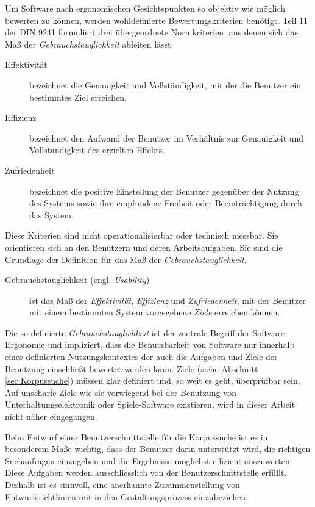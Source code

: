 Um Software nach ergonomischen Gesichtspunkten so objektiv wie möglich bewerten zu können, werden wohldefinierte Bewertungskriterien benötigt. Teil 11 der DIN 9241 formuliert drei übergeordnete Normkriterien, aus denen sich das Maß der \emph{Gebrauchstauglichkeit} ableiten lässt. 

\begin{description}
	\item[Effektivität]{bezeichnet die Genauigkeit und Vollständigkeit, mit der die Benutzer ein bestimmtes Ziel erreichen.}
	\item[Effizienz]{bezeichnet den Aufwand der Benutzer im Verhältnis zur Genauigkeit und Vollständigkeit des erzielten Effekts.}
	\item[Zufriedenheit]{bezeichnet die positive Einstellung der Benutzer gegenüber der Nutzung des Systems sowie ihre empfundene Freiheit oder Beeinträchtigung durch das System.}
\end{description}

Diese Kriterien sind nicht operationalisierbar oder technisch messbar. Sie orientieren sich an den Benutzern und deren Arbeitsaufgaben. Sie sind die Grundlage der Definition für das Maß der \emph{Gebrauchstauglichkeit}.

\begin{description}
	\item[Gebrauchstauglichkeit (engl.  \emph{Usability})]{ist das Maß der \emph{Effektivität}, \emph{Effizienz} und \emph{Zufriedenheit}, mit der Benutzer mit einem bestimmten System vorgegebene \emph{Ziele} erreichen können.}
\end{description}

Die so definierte \emph{Gebrauchstauglichkeit} ist der zentrale Begriff der Software-Ergonomie und impliziert, dass die Benutzbarkeit von Software nur innerhalb eines definierten Nutzungskontextes der auch die Aufgaben und Ziele der Benutzung einschließt bewertet werden kann. Ziele (siehe Abschnitt \ref{sec:Korpussuche}) müssen klar definiert und, so weit es geht, überprüfbar sein. Auf unscharfe Ziele wie sie vorwiegend bei der Benutzung von Unterhaltungselektronik oder Spiele-Software existieren, wird in dieser Arbeit nicht näher eingegangen.

Beim Entwurf einer Benutzerschnittstelle für die Korpussuche ist es in besonderem Maße wichtig, dass der Benutzer darin unterstützt wird, die richtigen Suchanfragen einzugeben und die Ergebnisse möglichst effizient auszuwerten. Diese Aufgaben werden ausschliesslich von der Benutzerschnittstelle erfüllt. Deshalb ist es sinnvoll, eine anerkannte Zusammenstellung von Entwurfsrichtlinien mit in den Gestaltungsprozess einzubeziehen.

